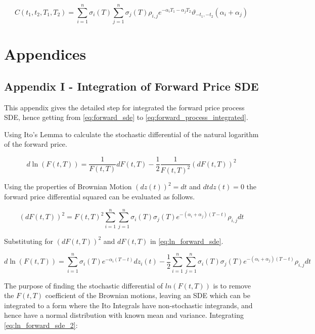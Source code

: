 \documentclass{article}
\begin{document}
\begin{equation}
    C(t_1, t_2, T_1, T_2) = \sum_{i=1}^n \sigma_i(T) \sum_{j=1}^n \sigma_j(T) \rho_{i,j} 
    e^{-\alpha_i T_1 -\alpha_j T_2} \vartheta_{-t_1, -t_2}(\alpha_i + \alpha_j)
\end{equation}

\section{Appendices} %
\subsection{Appendix I - Integration of Forward Price SDE}
This appendix gives the detailed step for integrated the forward price process
SDE, hence getting from \ref{eq:forward_sde} to \ref{eq:forward_process_integrated}.

\bigskip

Using Ito's Lemma to calculate the stochastic differential of the natural logarithm
of the forward price.

\begin{equation}
    \label{eq:ln_forward_sde}
    d\ln(F(t, T)) = \frac{1}{F(t, T)} dF(t, T) - \frac{1}{2}
        \frac{1}{F(t, T)^2} (dF(t, T))^2
\end{equation}

Using the properties of Brownian Motion $(dz(t))^2=dt$ and $dtdz(t)=0$ the forward
price differential squared can be evaluated as follows.

\begin{equation}
    \label{eq:df_squared}
    (dF(t, T))^2 = F(t, T)^2 \sum_{i=1}^n \sum_{j=1}^n \sigma_i(T) \sigma_j(T)
    e^{-(\alpha_i + \alpha_j)(T-t)}\rho_{i,j}dt
\end{equation}

Substituting for $(dF(t, T))^2$ and $dF(t, T)$ in \ref{eq:ln_forward_sde}.

\begin{equation}
    \label{eq:ln_forward_sde_2}
    d\ln(F(t, T)) = \sum_{i=1}^n \sigma_i(T)e^{-\alpha_i(T-t)}dz_i(t) - 
    \frac{1}{2} \sum_{i=1}^n \sum_{j=1}^n \sigma_i(T) \sigma_j(T)
    e^{-(\alpha_i + \alpha_j)(T-t)}\rho_{i,j}dt
\end{equation}

The purpose of finding the stochastic differential of $ln(F(t, T))$ is to remove the
$F(t, T)$ coefficient of the Brownian motions, leaving an SDE which can be integrated
to a form where the Ito Integrals have non-stochastic integrands, and hence have a normal
distribution with known mean and variance. Integrating \ref{eq:ln_forward_sde_2}:
\end{document}
